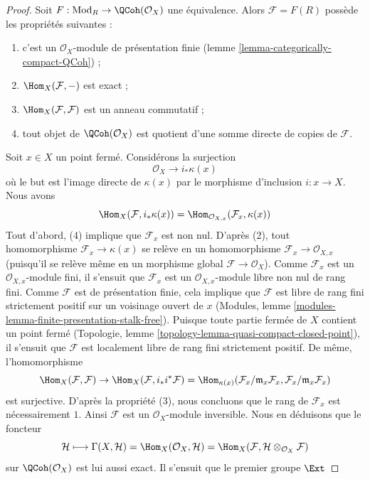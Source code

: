 \begin{proof}
Soit $F : \text{Mod}_R \to \QCoh(\mathcal{O}_X)$ une équivalence.
Alors $\mathcal{F} = F(R)$ possède les propriétés suivantes :
\begin{enumerate}
\item c'est un $\mathcal{O}_X$-module de présentation finie
(lemme \ref{lemma-categorically-compact-QCoh}) ;
\item $\Hom_X(\mathcal{F}, -)$ est exact ;
\item $\Hom_X(\mathcal{F}, \mathcal{F})$ est un anneau commutatif ;
\item tout objet de $\QCoh(\mathcal{O}_X)$ est quotient d'une somme directe
de copies de $\mathcal{F}$.
\end{enumerate}
Soit $x \in X$ un point fermé. Considérons la surjection
$$
\mathcal{O}_X \to i_*\kappa(x)
$$
où le but est l'image directe de $\kappa(x)$ par le morphisme d'inclusion
$i : x \to X$. Nous avons
$$
\Hom_X(\mathcal{F}, i_*\kappa(x)) =
\Hom_{\mathcal{O}_{X, x}}(\mathcal{F}_x, \kappa(x))
$$
Tout d'abord, (4) implique que $\mathcal{F}_x$ est non nul.
D'après (2), tout homomorphisme $\mathcal{F}_x \to \kappa(x)$ se relève en
un homomorphisme $\mathcal{F}_x \to \mathcal{O}_{X, x}$ (puisqu'il se
relève même en un morphisme global $\mathcal{F} \to \mathcal{O}_X$).
Comme $\mathcal{F}_x$ est un $\mathcal{O}_{X, x}$-module fini, il s'ensuit
que $\mathcal{F}_x$ est un $\mathcal{O}_{X, x}$-module libre non nul de rang fini.
Comme $\mathcal{F}$ est de présentation finie, cela implique que
$\mathcal{F}$ est libre de rang fini strictement positif sur un voisinage ouvert de $x$
(Modules, lemme \ref{modules-lemma-finite-presentation-stalk-free}).
Puisque toute partie fermée de $X$ contient un point fermé
(Topologie, lemme \ref{topology-lemma-quasi-compact-closed-point}),
il s'ensuit que $\mathcal{F}$ est localement libre de rang fini strictement positif.
De même, l'homomorphisme
$$
\Hom_X(\mathcal{F}, \mathcal{F}) \to
\Hom_X(\mathcal{F}, i_*i^*\mathcal{F}) =
\Hom_{\kappa(x)}(\mathcal{F}_x/\mathfrak m_x \mathcal{F}_x,
\mathcal{F}_x/\mathfrak m_x \mathcal{F}_x)
$$
est surjective. D'après la propriété (3), nous concluons que le rang de
$\mathcal{F}_x$ est nécessairement $1$. Ainsi $\mathcal{F}$ est un
$\mathcal{O}_X$-module inversible. Nous en déduisons que le foncteur
$$
\mathcal{H}
\longmapsto
\Gamma(X, \mathcal{H}) = \Hom_X(\mathcal{O}_X, \mathcal{H}) =
\Hom_X(\mathcal{F}, \mathcal{H} \otimes_{\mathcal{O}_X} \mathcal{F})
$$
sur $\QCoh(\mathcal{O}_X)$ est lui aussi exact. Il s'ensuit que le premier
groupe $\Ext$

\end{proof}
